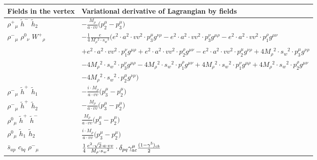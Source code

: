 \begin{center}
\begin{tabular}{|l|l|} \hline
Fields in the vertex & Variational derivative of Lagrangian by fields \\ \hline
$\rho^+{}_{\mu }$ \phantom{-} $\widetilde{h}^-{}_{}$ \phantom{-} $\widetilde{h}_2{}_{}$ \phantom{-}  &
	$-\frac{ M_{\rho}}{ a \cdot vv}\big(p_2^\mu -p_3^\mu \big)$\\[2mm]
$\rho^-{}_{\mu }$ \phantom{-} $\rho^0{}_{\nu }$ \phantom{-} $W^+{}_{\rho }$ \phantom{-}  &
	$-\frac{1}{4}\frac{ e}{ M_{\rho}{}^2  \cdot s_w{}^3 }\big( e{}^2 \cdot  a{}^2 \cdot  vv{}^2 \cdot p_3^\mu g^{\nu \rho} - e{}^2 \cdot  a{}^2 \cdot  vv{}^2 \cdot p_3^\nu g^{\mu \rho} - e{}^2 \cdot  a{}^2 \cdot  vv{}^2 \cdot p_1^\rho g^{\mu \nu} $ \\[2mm]
  & $+ e{}^2 \cdot  a{}^2 \cdot  vv{}^2 \cdot p_1^\nu g^{\mu \rho} + e{}^2 \cdot  a{}^2 \cdot  vv{}^2 \cdot p_2^\rho g^{\mu \nu} - e{}^2 \cdot  a{}^2 \cdot  vv{}^2 \cdot p_2^\mu g^{\nu \rho} +4 M_{\rho}{}^2 \cdot  s_w{}^2 \cdot p_3^\mu g^{\nu \rho} $ \\[2mm]
  & $-4 M_{\rho}{}^2 \cdot  s_w{}^2 \cdot p_3^\nu g^{\mu \rho} -4 M_{\rho}{}^2 \cdot  s_w{}^2 \cdot p_1^\rho g^{\mu \nu} +4 M_{\rho}{}^2 \cdot  s_w{}^2 \cdot p_1^\nu g^{\mu \rho} +4 M_{\rho}{}^2 \cdot  s_w{}^2 \cdot p_2^\rho g^{\mu \nu} $ \\[2mm]
  & $-4 M_{\rho}{}^2 \cdot  s_w{}^2 \cdot p_2^\mu g^{\nu \rho} \big)$\\[2mm]
$\rho^-{}_{\mu }$ \phantom{-} $\widetilde{h}^+{}_{}$ \phantom{-} $\widetilde{h}_1{}_{}$ \phantom{-}  &
	$-\frac{ i \cdot M_{\rho}}{ a \cdot vv}\big(p_3^\mu -p_2^\mu \big)$\\[2mm]
$\rho^-{}_{\mu }$ \phantom{-} $\widetilde{h}^+{}_{}$ \phantom{-} $\widetilde{h}_2{}_{}$ \phantom{-}  &
	$-\frac{ M_{\rho}}{ a \cdot vv}\big(p_3^\mu -p_2^\mu \big)$\\[2mm]
$\rho^0{}_{\mu }$ \phantom{-} $\widetilde{h}^+{}_{}$ \phantom{-} $\widetilde{h}^-{}_{}$ \phantom{-}  &
	$\frac{ M_{\rho}}{ a \cdot vv}\big(p_3^\mu -p_2^\mu \big)$\\[2mm]
$\rho^0{}_{\mu }$ \phantom{-} $\widetilde{h}_1{}_{}$ \phantom{-} $\widetilde{h}_2{}_{}$ \phantom{-}  &
	$\frac{ i \cdot M_{\rho}}{ a \cdot vv}\big(p_3^\mu -p_2^\mu \big)$\\[2mm]
$\bar{s}{}_{a p }$ \phantom{-} $c{}_{b q }$ \phantom{-} $\rho^-{}_{\mu }$ \phantom{-}  &
	$\frac{1}{4}\frac{ e{}^2  \cdot\sqrt{2} \cdot a \cdot vv}{ M_{\rho} \cdot s_w{}^2 }\cdot \delta_{p q} \gamma_{a c}^\mu {(1-\gamma^5)_{c b}\over 2} $\\[2mm]

\end{tabular}
\end{center}
